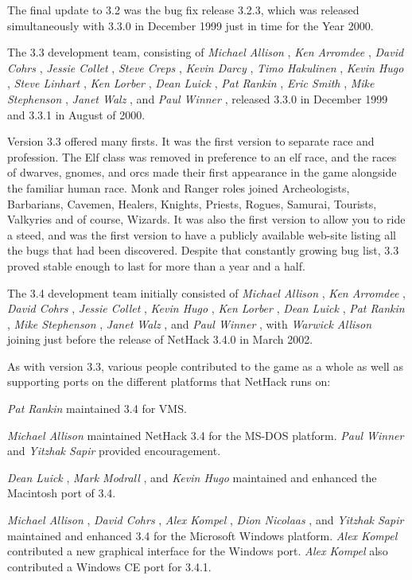 The final update to 3.2 was the bug fix release 3.2.3, which was released
simultaneously with 3.3.0 in December 1999 just in time for the Year 2000.

The 3.3 development team, consisting of %
{\it Michael Allison}%
, %
{\it Ken Arromdee}%
, 
%
{\it David Cohrs}%
, %
{\it Jessie Collet}%
, %
{\it Steve Creps}%
, %
{\it Kevin Darcy}%
, 
%
{\it Timo Hakulinen}%
, %
{\it Kevin Hugo}%
, %
{\it Steve Linhart}%
, %
{\it Ken Lorber}%
, 
%
{\it Dean Luick}%
, %
{\it Pat Rankin}%
, %
{\it Eric Smith}%
, %
{\it Mike Stephenson}%
, 
%
{\it Janet Walz}%
, and %
{\it Paul Winner}%
, released 3.3.0 in 
December 1999 and 3.3.1 in August of 2000.

Version 3.3 offered many firsts. It was the first version to separate race 
and profession. The Elf class was removed in preference to an elf race, 
and the races of dwarves, gnomes, and orcs made their first appearance in 
the game alongside the familiar human race.  Monk and Ranger roles joined 
Archeologists, Barbarians, Cavemen, Healers, Knights, Priests, Rogues, Samurai, 
Tourists, Valkyries and of course, Wizards.  It was also the first version
to allow you to ride a steed, and was the first version to have a publicly 
available web-site listing all the bugs that had been discovered.  Despite 
that constantly growing bug list, 3.3 proved stable enough to last for
more than a year and a half.

The 3.4 development team initially consisted of
%
{\it Michael Allison}%
, %
{\it Ken Arromdee}%
,
%
{\it David Cohrs}%
, %
{\it Jessie Collet}%
, %
{\it Kevin Hugo}%
, %
{\it Ken Lorber}%
,
%
{\it Dean Luick}%
, %
{\it Pat Rankin}%
, %
{\it Mike Stephenson}%
, 
%
{\it Janet Walz}%
, and %
{\it Paul Winner}%
, with  %
{\it Warwick Allison}%
joining 
just before the release of NetHack 3.4.0 in March 2002.

As with version 3.3, various people contributed to the game as a whole as
well as supporting ports on the different platforms that NetHack runs on:

%
{\it Pat Rankin}%
maintained 3.4 for VMS.

%
{\it Michael Allison}%
maintained NetHack 3.4 for the MS-DOS platform.  %
{\it Paul Winner}%
and %
{\it Yitzhak Sapir}%
provided encouragement.

%
{\it Dean Luick}%
, %
{\it Mark Modrall}%
, and %
{\it Kevin Hugo}%
maintained and enhanced the
Macintosh port of 3.4.

%
{\it Michael Allison}%
, %
{\it David Cohrs}%
, %
{\it Alex Kompel}%
, %
{\it Dion Nicolaas}%
, and 
%
{\it Yitzhak Sapir}%
maintained and enhanced 3.4 for the Microsoft Windows platform.
%
{\it Alex Kompel}%
contributed a new graphical interface for the Windows port. 
%
{\it Alex Kompel}%
also contributed a Windows CE port for 3.4.1.

